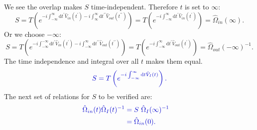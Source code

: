 \documentclass[12pt, titlepage]{article}
\begin{document}
%	 

We see the overlap makes $ S $ time-independent. Therefore $ t $  is set to  $ \infty $:
\begin{equation}\label{eq:S_equal_in_infty}
S=T\left( e^{-i\int_{-\infty}^{\infty}\mathrm{d}t^{\prime} \hat{V}_{in}(t^{\prime})
	 -i\int_{\infty}^{\infty}\mathrm{d}t^{\prime \prime} \hat{V}_{out}(t^{\prime \prime})} \right)
=T\left( e^{-i\int_{-\infty}^{\infty}\mathrm{d}t^{\prime} \hat{V}_{in}(t^{\prime})}\right)
=\hat{\Omega}_{in}(\infty).
\end{equation}
Or we choose $ -\infty $:
\begin{equation}
S=T\left( e^{-i\int_{-\infty}^{-\infty}\mathrm{d}t^{\prime} \hat{V}_{in}(t^{\prime})
	 -i\int_{-\infty}^{\infty}\mathrm{d}t^{\prime \prime} \hat{V}_{out}(t^{\prime \prime})} \right)
=T\left( e^{-i\int_{-\infty}^{\infty}\mathrm{d}t^{\prime} \hat{V}_{out}(t^{\prime})}\right)
=\hat{\Omega}_{out}(-\infty)^{-1}.
\end{equation}
The time independence and integral over all $ t $ makes them equal. 
\begin{equation}\label{eq:S_equal_in_plus_minus_infty}
\textcolor[RGB]{0,0,204}{
S=T\left( e^{-i\int_{-\infty}^{\infty}\mathrm{d}t \hat{V}_{I}(t)}\right)
.}
\end{equation}
The next set of relations for $ S $ to be verified are:
\begin{subequations}
\textcolor[RGB]{0,0,204}{
\begin{align}
	\hat{\Omega}_{in}(t)\hat{\Omega}_{I}(t)^{-1}
	&=S\ \hat{\Omega}_{I}(\infty)^{-1}
	&\\
	&=
	\hat{\Omega}_{in}(0)	.
\end{align}
}
\end{subequations}
\end{document}
